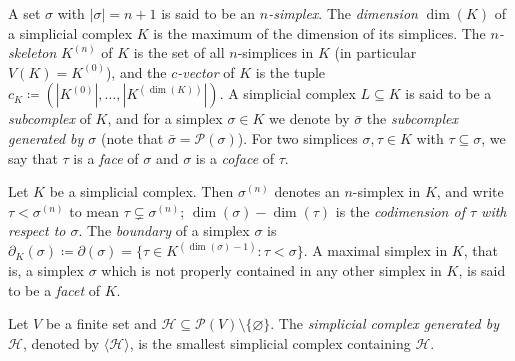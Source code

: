 \begin{definition}
    A set $\sigma$ with $|\sigma| = n + 1$ is said to be an \emph{$n$-simplex}. The \emph{dimension} $\dim(K)$ of a simplicial
    complex $K$ is the maximum of the dimension of its simplices. The \emph{$n$-skeleton} $K^{(n)}$ of $K$ is the set of all
    $n$-simplices in $K$ (in particular $V(K) = K^{(0)}$), and the \emph{$c$-vector} of $K$ is the tuple $c_K \coloneqq
    (|K^{(0)}|, \dots, |K^{(\dim(K))}|)$. A simplicial complex $L \subseteq K$ is said to be a \emph{subcomplex}
    of $K$, and for a simplex $\sigma \in K$ we denote by $\bar{\sigma}$ the \emph{subcomplex generated by $\sigma$} (note
    that $\bar{\sigma} = \mathcal{P}(\sigma)$). For two simplices $\sigma, \tau \in K$ with $\tau \subseteq \sigma$, we say that
    $\tau$ is a \emph{face} of $\sigma$ and $\sigma$ is a \emph{coface} of $\tau$.
\end{definition}

\begin{definition}
    Let $K$ be a simplicial complex. Then $\sigma^{(n)}$ denotes an $n$-simplex in $K$, and write $\tau < \sigma^{(n)}$ to mean
    $\tau \subsetneq \sigma^{(n)}$; $\dim(\sigma) - \dim(\tau)$ is the \emph{codimension of $\tau$ with respect to $\sigma$}. The
    \emph{boundary} of a simplex $\sigma$ is $\partial_K(\sigma) \coloneqq \partial(\sigma) = \{\tau \in K^{(\dim(\sigma) - 1)}
    : \tau < \sigma\}$. A maximal simplex in $K$, that is, a simplex $\sigma$ which is not properly contained in any other simplex
    in $K$, is said to be a \emph{facet} of $K$.
\end{definition}


\begin{definition}
    Let $V$ be a finite set and $\mathcal{H} \subseteq \mathcal{P}(V) \setminus \{\varnothing\}$. The \emph{simplicial complex generated by
    $\mathcal{H}$}, denoted by $\langle \mathcal{H} \rangle$, is the smallest simplicial complex containing $\mathcal{H}$.
\end{definition}

